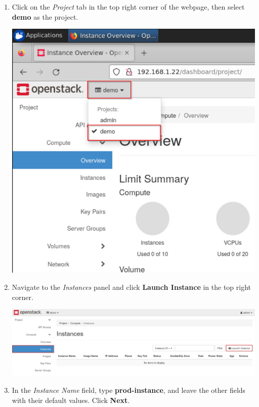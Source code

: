 \documentclass[letterpaper, 12pt]{article}
\begin{document}
\begin{enumerate}
    \item Click on the \textit{Project} tab in the top right corner of the webpage, then select \textbf{demo} as the
    project.

    \begin{center}
        \includegraphics[scale=0.75]{images/part1/step4.png}
    \end{center}

    \item Navigate to the \textit{Instances} panel and click \textbf{Launch Instance} in the top right corner.
    
    \begin{center}
        \includegraphics[width=\linewidth]{images/part1/step5.png}
    \end{center}

    \item In the \textit{Instance Name} field, type \textbf{prod-instance}, and leave the other fields with their
    default values. Click \textbf{Next}.


\end{enumerate}
\end{document}
